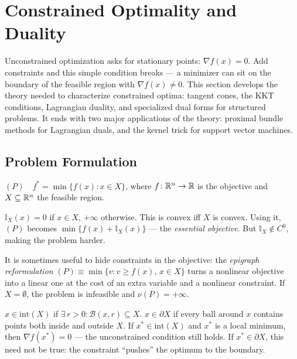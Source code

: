 \section{Constrained Optimality and Duality}\label{sec:constrained-theory}

Unconstrained optimization asks for stationary points: $\nabla f(x) = 0$.
Add constraints and this simple condition breaks --- a minimizer can sit on the boundary of the feasible region with $\nabla f(x) \neq 0$.
This section develops the theory needed to characterize constrained optima: tangent cones, the KKT conditions, Lagrangian duality, and specialized dual forms for structured problems.
It ends with two major applications of the theory: proximal bundle methods for Lagrangian duals, and the kernel trick for support vector machines.


\subsection{Problem Formulation}\label{ssec:constrained-formulation}

\begin{defn}\label{def:constrained-P}
	$(P) \quad f^* = \min\{f(x) : x \in X\}$,
	where $f \colon \mathbb{R}^n \to \mathbb{R}$ is the objective and $X \subseteq \mathbb{R}^n$ the feasible region.
\end{defn}

\begin{defn}\label{def:indicator}
	$\mathbb{I}_X(x) = 0$ if $x \in X$, $+\infty$ otherwise.
	This is convex iff $X$ is convex.
	Using it, $(P)$ becomes $\min\{f(x) + \mathbb{I}_X(x)\}$ --- the \textit{essential objective}.
	But $\mathbb{I}_X \notin C^0$, making the problem harder.
\end{defn}

It is sometimes useful to hide constraints in the objective: the \textit{epigraph reformulation} $(P) \equiv \min\{v : v \geq f(x),\, x \in X\}$ turns a nonlinear objective into a linear one at the cost of an extra variable and a nonlinear constraint.
If $X = \emptyset$, the problem is infeasible and $\nu(P) = +\infty$.

\begin{defn}\label{def:interior-boundary}
	$x \in \mathrm{int}(X)$ if $\exists\, r > 0 : \mathcal{B}(x, r) \subseteq X$.
	$x \in \partial X$ if every ball around $x$ contains points both inside and outside $X$.
	If $x^* \in \mathrm{int}(X)$ and $x^*$ is a local minimum, then $\nabla f(x^*) = 0$ --- the unconstrained condition still holds.
	If $x^* \in \partial X$, this need not be true: the constraint ``pushes'' the optimum to the boundary.
\end{defn}

